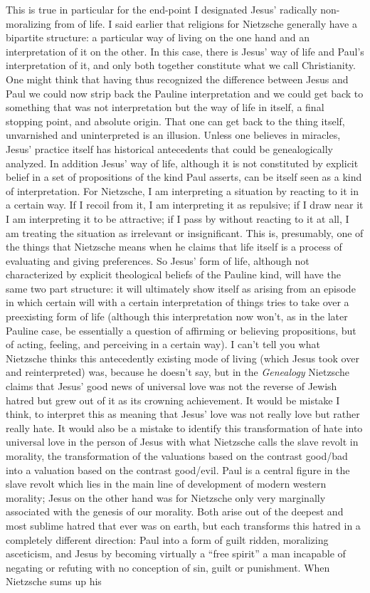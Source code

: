 This is true in particular for the end-point I designated Jesus' radically non-moralizing from of life. I said earlier that religions for Nietzsche generally have a bipartite structure: a particular way of living on the one hand and an interpretation of it on the other. In this case, there is Jesus' way of life and Paul's interpretation of it, and only both together constitute what we call Christianity. One might think that having thus recognized the difference between Jesus and Paul we could now strip back the Pauline interpretation and we could get back to something that was not interpretation but the way of life in itself, a final stopping point, and absolute origin. That one can get back to the thing itself, unvarnished and uninterpreted is an illusion. Unless one believes in miracles, Jesus' practice itself has historical antecedents that could be genealogically analyzed. In addition Jesus' way of life, although it is not constituted by explicit belief in a set of propositions of the kind Paul asserts, can be itself seen as a kind of interpretation. For Nietzsche, I am interpreting a situation by reacting to it in a certain way. If I recoil from it, I am interpreting it as repulsive; if I draw near it I am interpreting it to be attractive; if I pass by without reacting to it at all, I am treating the situation as irrelevant or insignificant. This is, presumably, one of the things that Nietzsche means when he claims that life itself is a process of evaluating and giving preferences. So Jesus' form of life, although not characterized by explicit theological beliefs of the Pauline kind, will have the same two part structure: it will ultimately show itself as arising from an episode in which certain will with a certain interpretation of things tries to take over a preexisting form of life (although this interpretation now won't, as in the later Pauline case, be essentially a question of affirming or believing propositions, but of acting, feeling, and perceiving in a certain way). I can't tell you what Nietzsche thinks this antecedently existing mode of living (which Jesus took over and reinterpreted) was, because he doesn't say, but in the \emph{Genealogy} Nietzsche claims that Jesus' good news of universal love was not the reverse of Jewish hatred but grew out of it as its crowning achievement. It would be mistake I think, to interpret this as meaning that Jesus' love was not really love but rather really hate. It would also be a mistake to identify this transformation of hate into universal love in the person of Jesus with what Nietzsche calls the slave revolt in morality, the transformation of the valuations based on the contrast good/bad into a valuation based on the contrast good/evil. Paul is a central figure in the slave revolt which lies in the main line of development of modern western morality; Jesus on the other hand was for Nietzsche only very marginally associated with the genesis of our morality. Both arise out of the deepest and most sublime hatred that ever was on earth, but each transforms this hatred in a completely different direction: Paul into a form of guilt ridden, moralizing asceticism, and Jesus by becoming virtually a ``free spirit'' a man incapable of negating or refuting with no conception of sin, guilt or punishment. When Nietzsche sums up his 